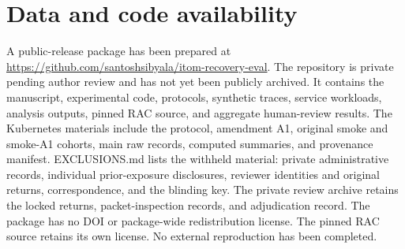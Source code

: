 \documentclass[conference,10pt]{IEEEtran}
\begin{document}
\section*{Data and code availability}

A public-release package has been prepared at \url{https://github.com/santoshsibyala/itom-recovery-eval}. The repository is private pending author review and has not yet been publicly archived. It contains the manuscript, experimental code, protocols, synthetic traces, service workloads, analysis outputs, pinned RAC source, and aggregate human-review results. The Kubernetes materials include the protocol, amendment A1, original smoke and smoke-A1 cohorts, main raw records, computed summaries, and provenance manifest. EXCLUSIONS.md lists the withheld material: private administrative records, individual prior-exposure disclosures, reviewer identities and original returns, correspondence, and the blinding key. The private review archive retains the locked returns, packet-inspection records, and adjudication record. The package has no DOI or package-wide redistribution license. The pinned RAC source retains its own license. No external reproduction has been completed.
\end{document}
